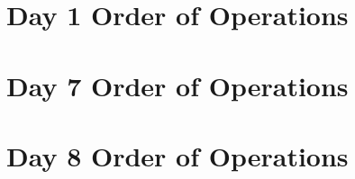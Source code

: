 \documentclass{article}
\begin{document}
\section*{Day 1 Order of Operations} \label{day1instructions}


\section*{Day 7 Order of Operations} \label{day7instructions}

\section*{Day 8 Order of Operations} \label{day7instructions}
\end{document}
